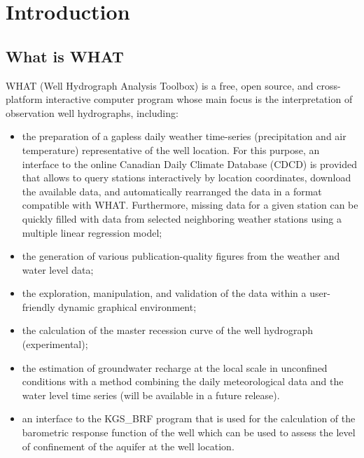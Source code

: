 \documentclass[WHATMANUAL.tex]{subfiles}
\begin{document}
\chapter{Introduction}

\section{What is WHAT}

WHAT (Well Hydrograph Analysis Toolbox) is a free, open source, and cross-platform interactive computer program whose main focus is the interpretation of observation well hydrographs, including:

\begin{itemize}

\item the preparation of a gapless daily weather time-series (precipitation and air temperature) representative of the well location. For this purpose, an interface to the online Canadian Daily Climate Database (CDCD) is provided that allows to query stations interactively by location coordinates, download the available data, and automatically rearranged the data in a format compatible with WHAT. Furthermore, missing data for a given station can be quickly filled with data from selected neighboring weather stations using a multiple linear regression model;

\item the generation of various publication-quality figures from the weather and water level data;

\item the exploration, manipulation, and validation of the data within a user-friendly dynamic graphical environment;

\item the calculation of the master recession curve of the well hydrograph (experimental);

\item the estimation of groundwater recharge at the local scale in unconfined conditions with a method combining the daily meteorological data and the water level time series (will be available in a future release).

\item an interface to the KGS\_BRF program \citep{butler_jr._new_2011,bohling_kansas_2011} that is used for the calculation of the barometric response function of the well which can be used to assess the level of confinement of the aquifer at the well location.

\end{itemize}
\end{document}
